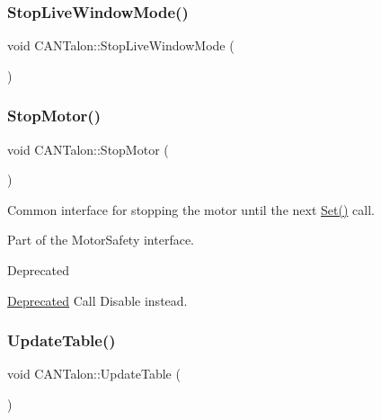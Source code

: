 \subsubsection{\texorpdfstring{Stop\+Live\+Window\+Mode()}{StopLiveWindowMode()}}
{\footnotesize\ttfamily void C\+A\+N\+Talon\+::\+Stop\+Live\+Window\+Mode (\begin{DoxyParamCaption}{ }\end{DoxyParamCaption})\hspace{0.3cm}{\ttfamily [override]}}

\mbox{\label{class_c_a_n_talon_ac4dab826cbcb67e04ba7c734dfb088bb}} 
\subsubsection{\texorpdfstring{Stop\+Motor()}{StopMotor()}}
{\footnotesize\ttfamily void C\+A\+N\+Talon\+::\+Stop\+Motor (\begin{DoxyParamCaption}{ }\end{DoxyParamCaption})\hspace{0.3cm}{\ttfamily [override]}}

Common interface for stopping the motor until the next \hyperlink{class_c_a_n_talon_a4562f7fb454693a0b19e6eba955a0c71}{Set()} call.

Part of the Motor\+Safety interface.

\begin{DoxyRefDesc}{Deprecated}
\item[\hyperlink{deprecated__deprecated000003}{Deprecated}]Call Disable instead. \end{DoxyRefDesc}
\mbox{\label{class_c_a_n_talon_adfe03538ebb9ec97392ae306af5c22e6}} 
\subsubsection{\texorpdfstring{Update\+Table()}{UpdateTable()}}
{\footnotesize\ttfamily void C\+A\+N\+Talon\+::\+Update\+Table (\begin{DoxyParamCaption}{ }\end{DoxyParamCaption})\hspace{0.3cm}{\ttfamily [override]}}

